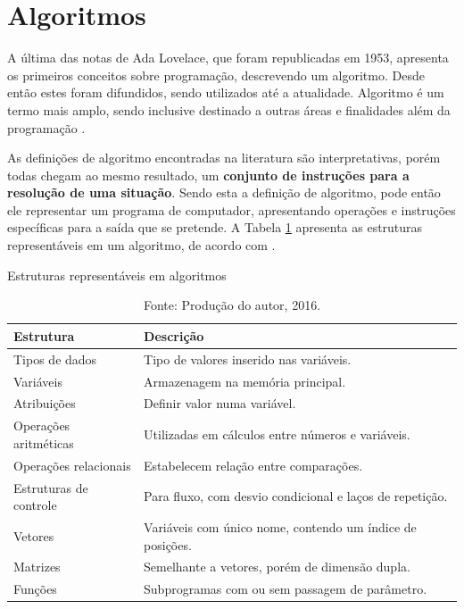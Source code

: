 \section{Algoritmos}

A última das notas de Ada Lovelace, que foram republicadas em 1953\nocite{1253887}, apresenta os primeiros conceitos sobre programação, descrevendo um algoritmo. Desde então estes foram difundidos, sendo utilizados até a atualidade. Algoritmo é um termo mais amplo, sendo inclusive destinado a outras áreas e finalidades além da programação \cite{medina2006etal}.

As definições de algoritmo encontradas na literatura são interpretativas, porém todas chegam ao mesmo resultado, um \textbf{conjunto de instruções para a resolução de uma situação}. Sendo esta a definição de algoritmo, pode então ele representar um programa de computador, apresentando operações e instruções específicas para a saída que se pretende. A Tabela \ref{tab:structsalgo} apresenta as estruturas representáveis em um algoritmo, de acordo com .


\begin{table}[ht]
\centering
  \caption{Estruturas representáveis em algoritmos}\label{tab:structsalgo}
\begin{tabular}{ l | l }\hline
\textbf{Estrutura} & \textbf{Descrição} \\ \hline
Tipos de dados & Tipo de valores inserido nas variáveis. \\ \hline
Variáveis & Armazenagem na memória principal. \\ \hline
Atribuições & Definir valor numa variável. \\ \hline
Operações aritméticas & Utilizadas em cálculos entre números e variáveis. \\ \hline
Operações relacionais & Estabelecem relação entre comparações. \\ \hline
Estruturas de controle & Para fluxo, com desvio condicional e laços de repetição. \\ \hline
Vetores & Variáveis com único nome, contendo um índice de posições. \\ \hline
Matrizes & Semelhante a vetores, porém de dimensão dupla. \\ \hline
Funções & Subprogramas com ou sem passagem de parâmetro.
\end{tabular}
  \caption*{\footnotesize Fonte: Produção do autor, 2016.}
\end{table}

